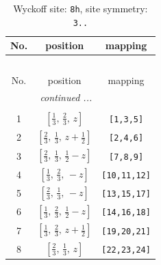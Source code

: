 \documentclass[fleqn,8pt]{jsarticle}
\begin{document}
\begin{longtable}{ccc}
\caption{Wyckoff site: {\tt 8h}, site symmetry: {\tt 3..}}
 \\
 \hline \hline
No. & position & mapping \\ \hline \endfirsthead

\multicolumn{2}{l}{\tablename\ \thetable{}} \\
 \hline \hline
No. & position & mapping \\ \hline \endhead

 \hline \hline
\multicolumn{2}{r}{\footnotesize\it continued ...} \\ \endfoot

 \hline \hline
\multicolumn{2}{r}{} \\ \endlastfoot

1 & $\left[ \frac{1}{3},\, \frac{2}{3},\, z \right]$ & {\tt [1,3,5]} \\ \hline
2 & $\left[ \frac{2}{3},\, \frac{1}{3},\, z + \frac{1}{2} \right]$ & {\tt [2,4,6]} \\ \hline
3 & $\left[ \frac{2}{3},\, \frac{1}{3},\, \frac{1}{2} - z \right]$ & {\tt [7,8,9]} \\ \hline
4 & $\left[ \frac{1}{3},\, \frac{2}{3},\, - z \right]$ & {\tt [10,11,12]} \\ \hline
5 & $\left[ \frac{2}{3},\, \frac{1}{3},\, - z \right]$ & {\tt [13,15,17]} \\ \hline
6 & $\left[ \frac{1}{3},\, \frac{2}{3},\, \frac{1}{2} - z \right]$ & {\tt [14,16,18]} \\ \hline
7 & $\left[ \frac{1}{3},\, \frac{2}{3},\, z + \frac{1}{2} \right]$ & {\tt [19,20,21]} \\ \hline
8 & $\left[ \frac{2}{3},\, \frac{1}{3},\, z \right]$ & {\tt [22,23,24]} \\
\end{longtable}
\renewcommand{\arraystretch}{1.2}
\end{document}
